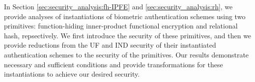 In Section \ref{sec:security_analysis:fh-IPFE} and \ref{sec:security_analysis:rh}, we provide analyses of instantiations of biometric authentication schemes using two primitives: function-hiding inner-product functional encryption and relational hash, repsectively. We first introduce the security of these primitives, and then we provide reductions from the UF and IND security of their instantiated authentication schemes to the security of the primitives. Our results demonstrate necessary and sufficient conditions and provide transformations for these instantiations to achieve our desired security.

